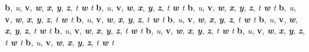 \textbf{b}, \emph{u}, \textbf{v}, \emph{\textbf{w}}, \emph{\textbf{x}}, \textbf{\emph{y}}, \textbf{\emph{z}}, \emph{t \textbf{w} t}
\textbf{b}, \emph{u}, \textbf{v}, \emph{\textbf{w}}, \emph{\textbf{x}}, \textbf{\emph{y}}, \textbf{\emph{z}}, \emph{t \textbf{w} t}
\textbf{b}, \emph{u}, \textbf{v}, \emph{\textbf{w}}, \emph{\textbf{x}}, \textbf{\emph{y}}, \textbf{\emph{z}}, \emph{t \textbf{w} t}
\textbf{b}, \emph{u}, \textbf{v}, \emph{\textbf{w}}, \emph{\textbf{x}}, \textbf{\emph{y}}, \textbf{\emph{z}}, \emph{t \textbf{w} t}
\textbf{b}, \emph{u}, \textbf{v}, \emph{\textbf{w}}, \emph{\textbf{x}}, \textbf{\emph{y}}, \textbf{\emph{z}}, \emph{t \textbf{w} t}
\textbf{b}, \emph{u}, \textbf{v}, \emph{\textbf{w}}, \emph{\textbf{x}}, \textbf{\emph{y}}, \textbf{\emph{z}}, \emph{t \textbf{w} t}
\textbf{b}, \emph{u}, \textbf{v}, \emph{\textbf{w}}, \emph{\textbf{x}}, \textbf{\emph{y}}, \textbf{\emph{z}}, \emph{t \textbf{w} t}
\textbf{b}, \emph{u}, \textbf{v}, \emph{\textbf{w}}, \emph{\textbf{x}}, \textbf{\emph{y}}, \textbf{\emph{z}}, \emph{t \textbf{w} t}
\textbf{b}, \emph{u}, \textbf{v}, \emph{\textbf{w}}, \emph{\textbf{x}}, \textbf{\emph{y}}, \textbf{\emph{z}}, \emph{t \textbf{w} t}
\textbf{b}, \emph{u}, \textbf{v}, \emph{\textbf{w}}, \emph{\textbf{x}}, \textbf{\emph{y}}, \textbf{\emph{z}}, \emph{t \textbf{w} t}
\textbf{b}, \emph{u}, \textbf{v}, \emph{\textbf{w}}, \emph{\textbf{x}}, \textbf{\emph{y}}, \textbf{\emph{z}}, \emph{t \textbf{w} t}



